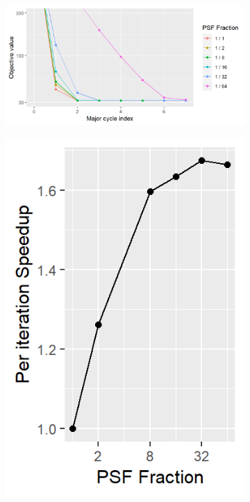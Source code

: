 \begin{figure}[h]
	\centering
	\begin{subfigure}[b]{0.58\linewidth}
		\includegraphics[width=\linewidth]{./chapters/10.results/gradient/ApproxDeconv/size.png}
	\end{subfigure}
	\begin{subfigure}[b]{0.195\linewidth}
		\includegraphics[width=\linewidth]{./chapters/10.results/gradient/ApproxDeconv/speedup_iter.png}

\end{subfigure}
\end{figure}
